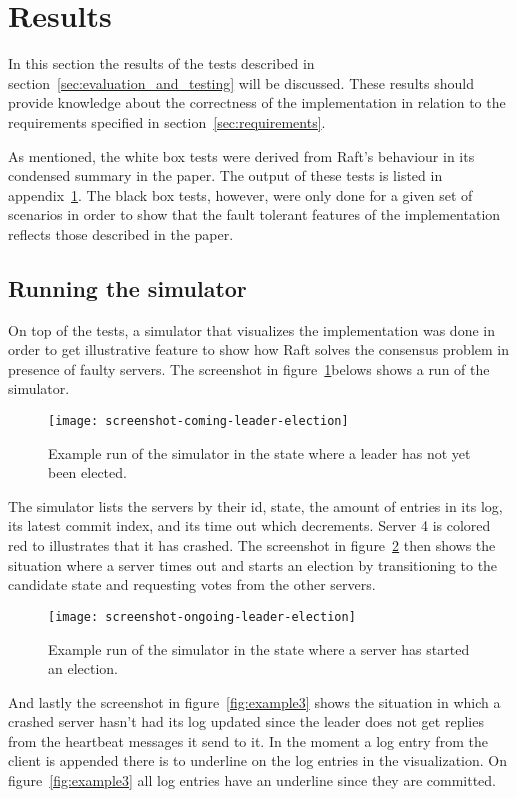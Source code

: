 \section{Results}
\label{sec:results}

In this section the results of the tests described in section~\ref{sec:evaluation_and_testing} will be discussed. These results should provide knowledge about the correctness of the implementation in relation to the requirements specified in section~\ref{sec:requirements}.

As mentioned, the white box tests were derived from Raft's behaviour in its condensed summary in the paper. The output of these tests is listed in appendix~\ref{sec:results}.
The black box tests, however, were only done for a given set of scenarios in order to show that the fault tolerant features of the implementation reflects those described in the paper.

\subsection{Running the simulator}
On top of the tests, a simulator that visualizes the implementation was done in order to get illustrative feature to show how Raft solves the consensus problem in presence of faulty servers. The screenshot in figure~\ref{fig:example1}belows shows a run of the simulator.

\begin{figure}[H]
\centering
\texttt{[image: screenshot-coming-leader-election]}
\caption{Example run of the simulator in the state where a leader has not yet been elected.}
\label{fig:example1}
\end{figure}

The simulator lists the servers by their id, state, the amount of entries in its log, its latest commit index, and its time out which decrements. Server 4 is colored red to illustrates that it has crashed.
The screenshot in figure~\ref{fig:example2} then shows the situation where a server times out and starts an election by transitioning to the candidate state and requesting votes from the other servers.

\begin{figure}[H]
\centering
\texttt{[image: screenshot-ongoing-leader-election]}
\caption{Example run of the simulator in the state where a server has started an election.}
\label{fig:example2}
\end{figure}

And lastly the screenshot in figure~\ref{fig:example3} shows the situation in which a crashed server hasn't had its log updated since the leader does not get replies from the heartbeat messages it send to it. In the moment a log entry from the client is appended there is to underline on the log entries in the visualization. On figure~\ref{fig:example3} all log entries have an underline since they are committed.

